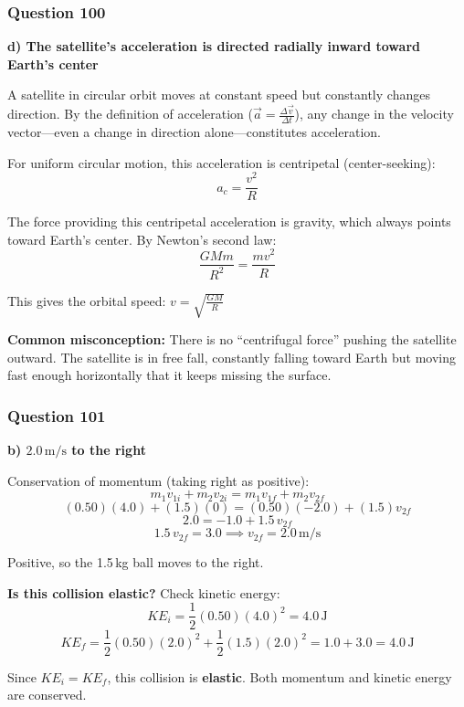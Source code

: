 \documentclass[12pt,letterpaper]{article}
\begin{document}
\subsubsection*{Question 100}

\begin{answerbox}
\textbf{d) The satellite's acceleration is directed radially inward toward Earth's center}
\end{answerbox}

\begin{explanationbox}
A satellite in circular orbit moves at constant speed but constantly changes direction. By the definition of acceleration ($\vec{a} = \frac{\Delta\vec{v}}{\Delta t}$), any change in the velocity vector---even a change in direction alone---constitutes acceleration.

For uniform circular motion, this acceleration is centripetal (center-seeking):
\[
a_c = \frac{v^2}{R}
\]

The force providing this centripetal acceleration is gravity, which always points toward Earth's center. By Newton's second law:
\[
\frac{GMm}{R^2} = \frac{mv^2}{R}
\]

This gives the orbital speed: $v = \sqrt{\frac{GM}{R}}$

\textbf{Common misconception:} There is no ``centrifugal force'' pushing the satellite outward. The satellite is in free fall, constantly falling toward Earth but moving fast enough horizontally that it keeps missing the surface.
\end{explanationbox}

\subsubsection*{Question 101}

\begin{answerbox}
\textbf{b) $2.0\,\text{m/s}$ to the right}
\end{answerbox}

\begin{explanationbox}
Conservation of momentum (taking right as positive):
\[
m_1 v_{1i} + m_2 v_{2i} = m_1 v_{1f} + m_2 v_{2f}
\]
\[
(0.50)(4.0) + (1.5)(0) = (0.50)(-2.0) + (1.5)v_{2f}
\]
\[
2.0 = -1.0 + 1.5\,v_{2f}
\]
\[
1.5\,v_{2f} = 3.0 \implies v_{2f} = 2.0\,\text{m/s}
\]

Positive, so the 1.5\,kg ball moves to the right.

\textbf{Is this collision elastic?} Check kinetic energy:
\[
KE_i = \frac{1}{2}(0.50)(4.0)^2 = 4.0\,\text{J}
\]
\[
KE_f = \frac{1}{2}(0.50)(2.0)^2 + \frac{1}{2}(1.5)(2.0)^2 = 1.0 + 3.0 = 4.0\,\text{J}
\]

Since $KE_i = KE_f$, this collision is \textbf{elastic}. Both momentum and kinetic energy are conserved.
\end{explanationbox}
\end{document}
